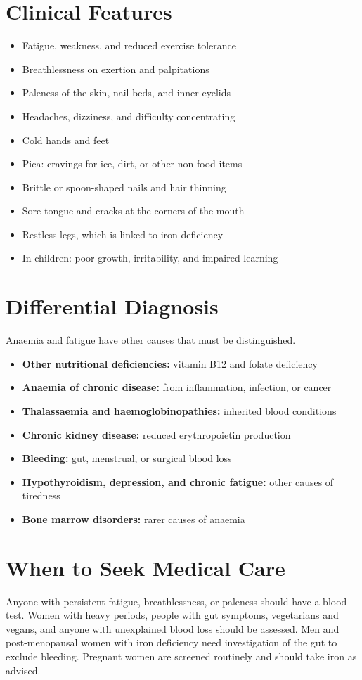 \section*{Clinical Features}
\begin{itemize}
    \item Fatigue, weakness, and reduced exercise tolerance
    \item Breathlessness on exertion and palpitations
    \item Paleness of the skin, nail beds, and inner eyelids
    \item Headaches, dizziness, and difficulty concentrating
    \item Cold hands and feet
    \item Pica: cravings for ice, dirt, or other non-food items
    \item Brittle or spoon-shaped nails and hair thinning
    \item Sore tongue and cracks at the corners of the mouth
    \item Restless legs, which is linked to iron deficiency
    \item In children: poor growth, irritability, and impaired learning
\end{itemize}

\section*{Differential Diagnosis}
Anaemia and fatigue have other causes that must be distinguished.
\begin{itemize}
    \item \textbf{Other nutritional deficiencies:} vitamin B12 and folate deficiency
    \item \textbf{Anaemia of chronic disease:} from inflammation, infection, or cancer
    \item \textbf{Thalassaemia and haemoglobinopathies:} inherited blood conditions
    \item \textbf{Chronic kidney disease:} reduced erythropoietin production
    \item \textbf{Bleeding:} gut, menstrual, or surgical blood loss
    \item \textbf{Hypothyroidism, depression, and chronic fatigue:} other causes of tiredness
    \item \textbf{Bone marrow disorders:} rarer causes of anaemia
\end{itemize}

\section*{When to Seek Medical Care}
Anyone with persistent fatigue, breathlessness, or paleness should have a blood test. Women with heavy periods, people with gut symptoms, vegetarians and vegans, and anyone with unexplained blood loss should be assessed. Men and post-menopausal women with iron deficiency need investigation of the gut to exclude bleeding. Pregnant women are screened routinely and should take iron as advised.

